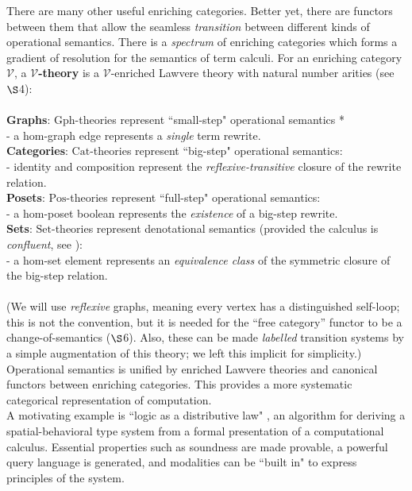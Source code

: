 \documentclass[a4paper,UKenglish]{article}
\theoremstyle{definition}
\newcommand{\Gph}{\mathrm{Gph}}
\newcommand{\Set}{\mathrm{Set}}
\newcommand{\Cat}{\mathrm{Cat}}
\newcommand{\Pos}{\mathrm{Pos}}
\newcommand{\V}{\mathscr{V}}
\begin{document}
There are many other useful enriching categories. Better yet, there are functors between them that allow the seamless \textit{transition} between different kinds of operational semantics. There is a \textit{spectrum} of enriching categories which forms a gradient of resolution for the semantics of term calculi. For an enriching category $\V$, a \textbf{$\V$-theory} is a $\V$-enriched Lawvere theory with natural number arities (see $\S$4):\\\\
\textbf{Graphs}: $\Gph$-theories represent ``small-step" operational semantics * \\ - a hom-graph edge represents a \textit{single} term rewrite.\\
\textbf{Categories}: $\Cat$-theories represent ``big-step" operational semantics:\\ - identity and composition represent the \textit{reflexive-transitive} closure of the rewrite relation.\\
\textbf{Posets}: $\Pos$-theories represent ``full-step" operational semantics:\\ - a hom-poset boolean represents the \textit{existence} of a big-step rewrite.\\
\textbf{Sets}: $\Set$-theories represent denotational semantics (provided the calculus is \textit{confluent}, see \cite{lam}):\\ - a hom-set element represents an \textit{equivalence class} of the symmetric closure of the big-step relation.\\\\
(We will use \textit{reflexive} graphs, meaning every vertex has a distinguished self-loop; this is not the convention, but it is needed for the ``free category'' functor to be a change-of-semantics ($\S$6). Also, these can be made \textit{labelled} transition systems by a simple augmentation of this theory; we left this implicit for simplicity.)\\

Operational semantics is unified by enriched Lawvere theories and canonical functors between enriching categories. This provides a more systematic categorical representation of computation.\\

A motivating example is ``logic as a distributive law" \cite{ladl}, an algorithm for deriving a spatial-behavioral type system from a formal presentation of a computational calculus. Essential properties such as soundness are made provable, a powerful query language is generated, and modalities can be ``built in" to express principles of the system.\\
\end{document}
